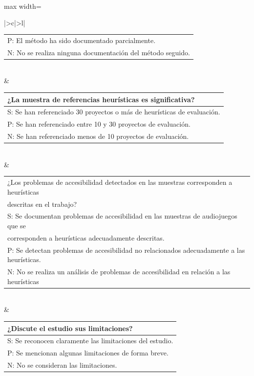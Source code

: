 \begin{center}
\begin{table}[h]
\begin{adjustbox}{max width=\textwidth}
\begin{NiceTabular}{ |>{\centering\arraybackslash}c|>{\centering\arraybackslash}l|  }
\begin{tabular}{@{}l@{}}
					P: El método ha sido documentado parcialmente. \\
					N: No se realiza ninguna documentación del método seguido. \\
				\end{tabular} \\
				 & \begin{tabular}{@{}l@{}}¿La muestra de referencias heurísticas es significativa? \cite[p ~23]{GuidelinesPerforming} \\ 
					\midrule[0.5pt]
					S: Se han referenciado 30 proyectos o más de heurísticas de evaluación. \\
					P: Se han referenciado entre 10 y 30 proyectos de evaluación. \\
					N: Se han referenciado menos de 10 proyectos de evaluación. \\\end{tabular} \\
				 & \begin{tabular}{@{}l@{}}¿Los problemas de accesibilidad detectados en las muestras corresponden a heurísticas\\ descritas en el trabajo?  \\ 
					\midrule[0.5pt]
					S: Se documentan problemas de accesibilidad en las muestras de audiojuegos que se \\corresponden a heurísticas adecuadamente descritas. \\
					P: Se detectan problemas de accesibilidad no relacionados adecuadamente a las heurísticas. \\
					N: No se realiza un análisis de problemas de accesibilidad en relación a las heurísticas \\\end{tabular} \\
				 & \begin{tabular}{@{}l@{}}¿Discute el estudio sus limitaciones?  \\ 
					\midrule[0.5pt]
					S: Se reconocen claramente las limitaciones del estudio. \\
					P: Se mencionan algunas limitaciones de forma breve. \\
					N: No se consideran las limitaciones. \\\end{tabular} \\
				\midrule
			\end{NiceTabular}
		\end{adjustbox}
	\end{table}
\end{center}
